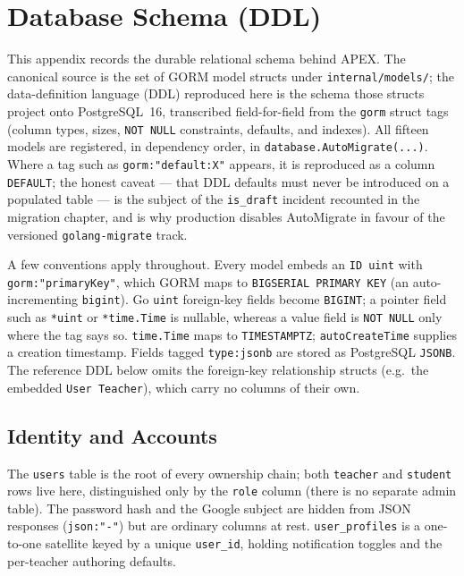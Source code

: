 \chapter{Database Schema (DDL)}\label{ch:ap-b}

This appendix records the durable relational schema behind APEX. The canonical
source is the set of GORM model structs under \texttt{internal/models/}; the
data-definition language (DDL) reproduced here is the schema those structs
project onto PostgreSQL~16, transcribed field-for-field from the \texttt{gorm}
struct tags (column types, sizes, \texttt{NOT NULL} constraints, defaults, and
indexes). All fifteen models are registered, in dependency order, in
\texttt{database.AutoMigrate(...)}. Where a tag such as
\texttt{gorm:"default:X"} appears, it is reproduced as a column \texttt{DEFAULT};
the honest caveat --- that DDL defaults must never be introduced on a populated
table --- is the subject of the \texttt{is\_draft} incident recounted in the
migration chapter, and is why production disables AutoMigrate in favour of the
versioned \texttt{golang-migrate} track.

A few conventions apply throughout. Every model embeds an \texttt{ID uint} with
\texttt{gorm:"primaryKey"}, which GORM maps to \texttt{BIGSERIAL PRIMARY KEY}
(an auto-incrementing \texttt{bigint}). Go \texttt{uint} foreign-key fields
become \texttt{BIGINT}; a pointer field such as \texttt{*uint} or
\texttt{*time.Time} is nullable, whereas a value field is \texttt{NOT NULL} only
where the tag says so. \texttt{time.Time} maps to \texttt{TIMESTAMPTZ};
\texttt{autoCreateTime} supplies a creation timestamp. Fields tagged
\texttt{type:jsonb} are stored as PostgreSQL \texttt{JSONB}. The reference DDL
below omits the foreign-key relationship structs (e.g.\ the embedded
\texttt{User Teacher}), which carry no columns of their own.

\section{Identity and Accounts}

The \texttt{users} table is the root of every ownership chain; both
\texttt{teacher} and \texttt{student} rows live here, distinguished only by the
\texttt{role} column (there is no separate admin table). The password hash and
the Google subject are hidden from JSON responses (\texttt{json:"-"}) but are
ordinary columns at rest. \texttt{user\_profiles} is a one-to-one satellite
keyed by a unique \texttt{user\_id}, holding notification toggles and the
per-teacher authoring defaults.

